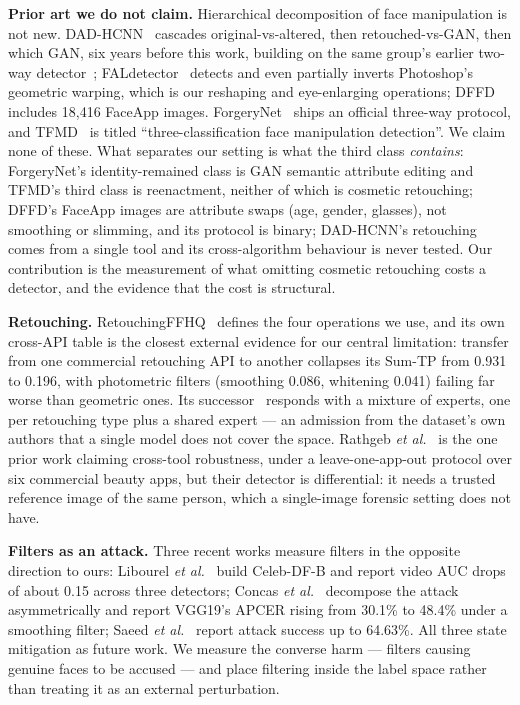 \documentclass[conference]{IEEEtran}
\begin{document}
\textbf{Prior art we do not claim.} Hierarchical decomposition of face manipulation is not
new. DAD-HCNN~\cite{jain2020} cascades original-vs-altered, then retouched-vs-GAN, then which
GAN, six years before this work, building on the same group's earlier
two-way detector~\cite{jain2018}; FALdetector~\cite{wang2019} detects and even partially
inverts Photoshop's geometric warping, which is our reshaping and eye-enlarging operations;
DFFD~\cite{dang2020} includes 18{,}416 FaceApp images. ForgeryNet~\cite{he2021} ships an
official three-way protocol, and TFMD~\cite{tfmd2023} is titled ``three-classification face
manipulation detection''. We claim none of these. What separates our setting is what the
third class \emph{contains}: ForgeryNet's identity-remained class is GAN semantic attribute
editing and TFMD's third class is reenactment, neither of which is cosmetic retouching;
DFFD's FaceApp images are attribute swaps (age, gender, glasses), not smoothing or slimming,
and its protocol is binary; DAD-HCNN's retouching comes from a single tool and its
cross-algorithm behaviour is never tested. Our contribution is the measurement of what
omitting cosmetic retouching costs a detector, and the evidence that the cost is structural.

\textbf{Retouching.} RetouchingFFHQ~\cite{ying2023} defines the four operations we use, and
its own cross-API table is the closest external evidence for our central limitation: transfer
from one commercial retouching API to another collapses its Sum-TP from 0.931 to 0.196, with
photometric filters (smoothing 0.086, whitening 0.041) failing far worse than geometric ones.
Its successor~\cite{liu2025} responds with a mixture of experts, one per retouching type plus
a shared expert --- an admission from the dataset's own authors that a single model does not
cover the space. Rathgeb \emph{et al.}~\cite{rathgeb2020} is the one prior work claiming
cross-tool robustness, under a leave-one-app-out protocol over six commercial beauty apps,
but their detector is differential: it needs a trusted reference image of the same person,
which a single-image forensic setting does not have.

\textbf{Filters as an attack.} Three recent works measure filters in the opposite direction to
ours: Libourel \emph{et al.}~\cite{libourel2024} build Celeb-DF-B and report video AUC drops
of about 0.15 across three detectors; Concas \emph{et al.}~\cite{concas2025} decompose the
attack asymmetrically and report VGG19's APCER rising from 30.1\% to 48.4\% under a smoothing
filter; Saeed \emph{et al.}~\cite{saeed2025} report attack success up to 64.63\%. All three
state mitigation as future work. We measure the converse harm --- filters causing genuine
faces to be accused --- and place filtering inside the label space rather than treating it as
an external perturbation.
\end{document}
